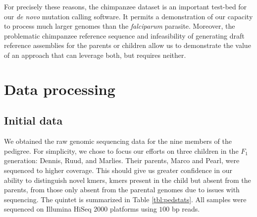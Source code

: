 For precisely these reasons, the chimpanzee dataset is an important test-bed for our \textit{de novo} mutation calling software.  It permits a demonstration of our capacity to process much larger genomes than the \textit{falciparum} parasite.  Moreover, the problematic chimpanzee reference sequence and infeasibility of generating draft reference assemblies for the parents or children allow us to demonstrate the value of an approach that can leverage both, but requires neither.

\section{Data processing}

\subsection{Initial data}

We obtained the raw genomic sequencing data for the nine members of the pedigree.  For simplicity, we chose to focus our efforts on three children in the $F_1$ generation: Dennis, Ruud, and Marlies.  Their parents, Marco and Pearl, were sequenced to higher coverage.  This should give us greater confidence in our ability to distinguish novel kmers, kmers present in the child but absent from the parents, from those only absent from the parental genomes due to issues with sequencing.  The quintet is summarized in Table \ref{tbl:pedstats}.  All samples were sequenced on Illumina HiSeq $2000$ platforms using $100$ bp reads.


